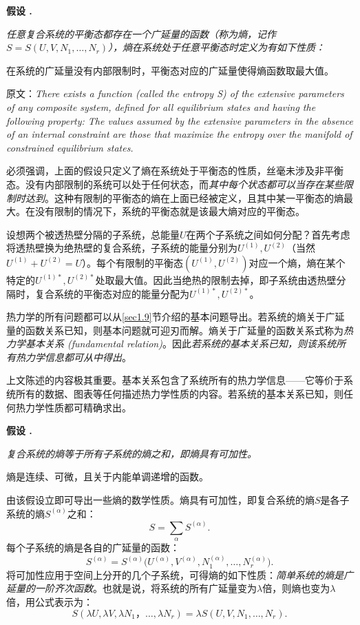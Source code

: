 {\bf 假设 \uppercase\expandafter{}. } {\it 任意复合系统的平衡态都存在一个广延量的函数（称为熵，记作$S = S(U, V, N_1, \dots, N_r)$），熵在系统处于任意平衡态时定义为有如下性质：

在系统的广延量没有内部限制时，平衡态对应的广延量使得熵函数取最大值。}


{原文：{\it There exists a function (called the entropy S) of the extensive parameters of any composite system, defined for all equilibrium states and 
having the following property: The values assumed by the extensive parameters in the absence of an internal constraint are those that maximize the entropy over the manifold of constrained equilibrium states. }}

必须强调，上面的假设只定义了熵在系统处于平衡态的性质，丝毫未涉及非平衡态。没有内部限制的系统可以处于任何状态，而{\it 其中每个状态都可以当存在某些限制时达到}。这种有限制的平衡态的熵在上面已经被定义，且其中某一平衡态的熵最大。在没有限制的情况下，系统的平衡态就是该最大熵对应的平衡态。

设想两个被透热壁分隔的子系统，总能量$U$在两个子系统之间如何分配？首先考虑将透热壁换为绝热壁的复合系统，子系统的能量分别为$U^{(1)}, U^{(2)}$（当然$U^{(1)} + U^{(2)} = U$）。每个有限制的平衡态$(U^{(1)}, U^{(2)})$对应一个熵，熵在某个特定的$U^{(1)*}, U^{(2)*}$处取最大值。因此当绝热的限制去掉，即子系统由透热壁分隔时，复合系统的平衡态对应的能量分配为$U^{(1)*}, U^{(2)*}$。

热力学的所有问题都可以从\ref{sec1.9}节介绍的基本问题导出。若系统的熵关于广延量的函数关系已知，则基本问题就可迎刃而解。熵关于广延量的函数关系式称为{\it 热力学基本关系 (fundamental relation)}。因此{\it 若系统的基本关系已知，则该系统所有热力学信息都可从中得出}。

上文陈述的内容极其重要。基本关系包含了系统所有的热力学信息——它等价于系统所有的数据、图表等任何描述热力学性质的内容。若系统的基本关系已知，则任何热力学性质都可精确求出。


{\bf 假设 \uppercase\expandafter{}. } {\it 
复合系统的熵等于所有子系统的熵之和，即熵具有可加性。

熵是连续、可微，且关于内能单调递增的函数。}

由该假设立即可导出一些熵的数学性质。熵具有可加性，即复合系统的熵$S$是各子系统的熵$S^{(\alpha)}$之和：
\begin{equation}
\label{equ1.4}
	S = \sum_\alpha S^{(\alpha)}.
\end{equation}
每个子系统的熵是各自的广延量的函数：
\begin{equation}
\label{equ1.5}
	S^{(\alpha)} = S^{(\alpha)} \Big( U^{(\alpha)}, V^{(\alpha)}, N_1^{(\alpha)}, \dots, N_r^{(\alpha)} \Big).
\end{equation}
将可加性应用于空间上分开的几个子系统，可得熵的如下性质：{\it 简单系统的熵是广延量的一阶齐次函数}。也就是说，将系统的所有广延量变为$\lambda$倍，则熵也变为$\lambda$倍，用公式表示为：
\begin{equation}
\label{equ1.6}
	S(\lambda U, \lambda V, \lambda N_1， \dots, \lambda N_r) = \lambda S(U, V, N_1, \dots, N_r).
\end{equation}

